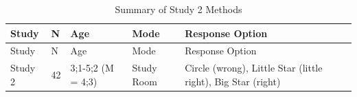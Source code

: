 \documentclass[floatsintext,man]{apa6}
\theoremstyle{definition}
\theoremstyle{definition}
\theoremstyle{definition}
\theoremstyle{remark}
\begin{document}
\begin{longtable}[]{@{}lllll@{}}
\caption{\label{tab:study2info} Summary of Study 2 Methods}\tabularnewline
\toprule
\begin{minipage}[b]{0.11\columnwidth}\raggedright\strut
Study\strut
\end{minipage} & \begin{minipage}[b]{0.04\columnwidth}\raggedright\strut
N\strut
\end{minipage} & \begin{minipage}[b]{0.21\columnwidth}\raggedright\strut
Age\strut
\end{minipage} & \begin{minipage}[b]{0.17\columnwidth}\raggedright\strut
Mode\strut
\end{minipage} & \begin{minipage}[b]{0.32\columnwidth}\raggedright\strut
Response Option\strut
\end{minipage}\tabularnewline
\midrule
\endfirsthead
\toprule
\begin{minipage}[b]{0.11\columnwidth}\raggedright\strut
Study\strut
\end{minipage} & \begin{minipage}[b]{0.04\columnwidth}\raggedright\strut
N\strut
\end{minipage} & \begin{minipage}[b]{0.21\columnwidth}\raggedright\strut
Age\strut
\end{minipage} & \begin{minipage}[b]{0.17\columnwidth}\raggedright\strut
Mode\strut
\end{minipage} & \begin{minipage}[b]{0.32\columnwidth}\raggedright\strut
Response Option\strut
\end{minipage}\tabularnewline
\midrule
\endhead
\begin{minipage}[t]{0.11\columnwidth}\raggedright\strut
Study 2\strut
\end{minipage} & \begin{minipage}[t]{0.04\columnwidth}\raggedright\strut
42\strut
\end{minipage} & \begin{minipage}[t]{0.21\columnwidth}\raggedright\strut
3;1-5;2 (M = 4;3)\strut
\end{minipage} & \begin{minipage}[t]{0.17\columnwidth}\raggedright\strut
Study Room\strut
\end{minipage} & \begin{minipage}[t]{0.32\columnwidth}\raggedright\strut
Circle (wrong), Little Star (little right), Big Star (right)\strut
\end{minipage}\tabularnewline
\bottomrule
\end{longtable}
\end{document}
